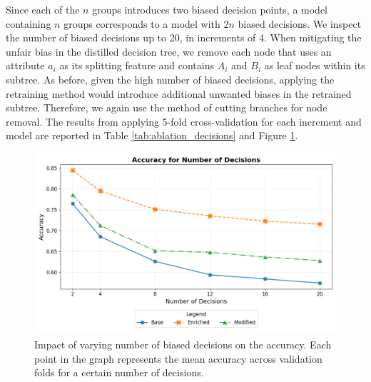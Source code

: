 Since each of the $n$ groups introduces two biased decision points, a model containing $n$ groups corresponds to a model with $2n$ biased decisions.
We inspect the number of biased decisions up to 20, in increments of 4. 
When mitigating the unfair bias in the distilled decision tree,
we remove each node that uses an attribute $a_i$ as its splitting feature and contains $A_i$ and $B_i$ as leaf nodes within its subtree.
As before, given the high number of biased decisions, applying the retraining method would introduce additional unwanted biases in the retrained subtree.
Therefore, we again use the method of cutting branches for node removal. 
The results from applying 5-fold cross-validation for each increment and model are reported in Table \ref{tab:ablation_decisions} and Figure \ref{fig:ablation_decisions_accuracy}. 

\begin{figure}[h!]
    \centering
    \includegraphics[width=\imagewidth]{gfx/ablation_decisions_accuracy.png}
    \caption{Impact of varying number of biased decisions on the accuracy.
    Each point in the graph represents the mean accuracy across validation folds for a certain number of decisions.}
    \label{fig:ablation_decisions_accuracy}
\end{figure}

